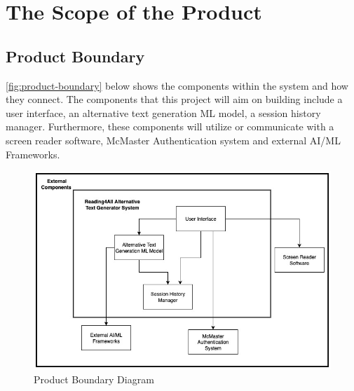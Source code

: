 \documentclass[12pt]{article}
\begin{document}
\section{The Scope of the Product}
\subsection{Product Boundary}
\autoref{fig:product-boundary} below shows the components within the system and how they connect. The components that this project will aim on building include a user interface, an alternative text generation ML model, a session history manager. Furthermore, these components will utilize or communicate with a screen reader software, McMaster Authentication system and external AI/ML Frameworks. 
\label{tab:product-boundary} 
\begin{figure}[H]
    \centering
    \includegraphics[width=1.0\textwidth]{images/Product_Boundary_Diagram.jpg}
    \caption{Product Boundary Diagram}
    \label{fig:product-boundary}
\end{figure}
\end{document}
